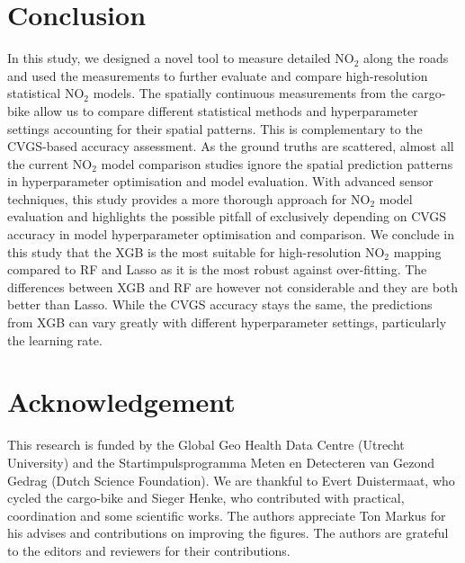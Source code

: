 \documentclass{article}
\begin{document}
\section{Conclusion}
In this study, we designed a novel tool to measure detailed NO$_2$ along the roads and used the measurements to further evaluate and compare high-resolution statistical NO$_2$ models.  The spatially continuous measurements from the cargo-bike allow us to compare different statistical methods and hyperparameter settings accounting for their spatial patterns. This is complementary to the CVGS-based accuracy assessment. As the ground truths are scattered, almost all the current NO$_2$ model comparison studies ignore the spatial prediction patterns in hyperparameter optimisation and model evaluation. With advanced sensor techniques, this study provides a more thorough approach for NO$_2$ model evaluation and highlights the possible pitfall of exclusively depending on CVGS accuracy in model hyperparameter optimisation and comparison. We conclude in this study that the XGB is the most suitable for high-resolution NO$_2$ mapping compared to RF and Lasso as it is the most robust against over-fitting. The differences between XGB and RF are however not considerable and they are both better than Lasso. While the CVGS accuracy stays the same, the predictions from XGB can vary greatly with different hyperparameter settings, particularly the learning rate.    


\section*{Acknowledgement}
This research is funded by the Global Geo Health Data Centre (Utrecht University) and the Startimpulsprogramma Meten en Detecteren van Gezond Gedrag (Dutch Science Foundation). We are thankful to Evert Duistermaat, who cycled the cargo-bike and Sieger Henke, who contributed with practical, coordination and some scientific works. The authors appreciate Ton Markus for his advises and contributions on improving the figures. The authors are grateful to the editors and reviewers for their contributions. 

\newpage


\end{document}
